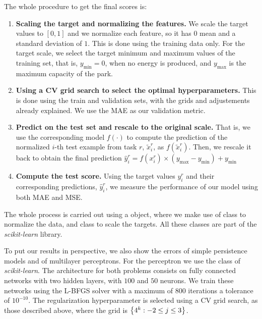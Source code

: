 %
The whole procedure to get the final scores is:
\begin{enumerate}
    \item \textbf{Scaling the target and normalizing the features.} We scale the target values to $[0, 1]$ and we normalize each feature, so it has $0$ mean and a standard deviation of $1$. This is done using the training data only. 
    For the target scale, we select the target minimum and maximum values of the training set, that is, $y_\text{min} = 0$, when no energy is produced, and $y_\text{max}$ is the maximum capacity of the park.    
    \item \textbf{Using a CV grid search to select the optimal hyperparameters.} This is done using the train and validation sets, with the grids and adjustements already explained. We use the MAE as our validation metric.
    \item \textbf{Predict on the test set and rescale to the original scale.} That is, we use the corresponding model $f(\cdot)$ to compute the prediction of the normalized $i$-th test example from task $r$, $\tilde{x}_i^r$, as $f(\tilde{x}_i^r)$. Then, we rescale it back to obtain the final prediction $\hat{y}_i^r = f(x_i^r) \times (y_\text{max} - y_\text{min} ) + y_\text{min}$
    \item \textbf{Compute the test score.} Using the target values $y_i^r$ and their corresponding predictions, $\hat{y}_i^r$, we measure the performance of our model using both MAE and MSE.
\end{enumerate}
The whole process is carried out using a  object, where we make use of class  to normalize the data, and  class to scale the targets. All these classes are part of the \emph{scikit-learn} library.

%
To put our results in perspective, we also show the errors of simple persistence models and of multilayer perceptrons. For the perceptron we use the  class of \emph{scikit-learn}. The architecture for both problems consists on fully connected networks with two hidden layers, with $100$ and $50$ neurons. We train these networks using the L-BFGS solver with a maximum of $800$ iterations a tolerance of $10^{-10}$. The regularization hyperparameter is selected using a CV grid search, as those described above, where the grid is $\left\{4^k: -2 \leq j \leq 3\right\}$.






